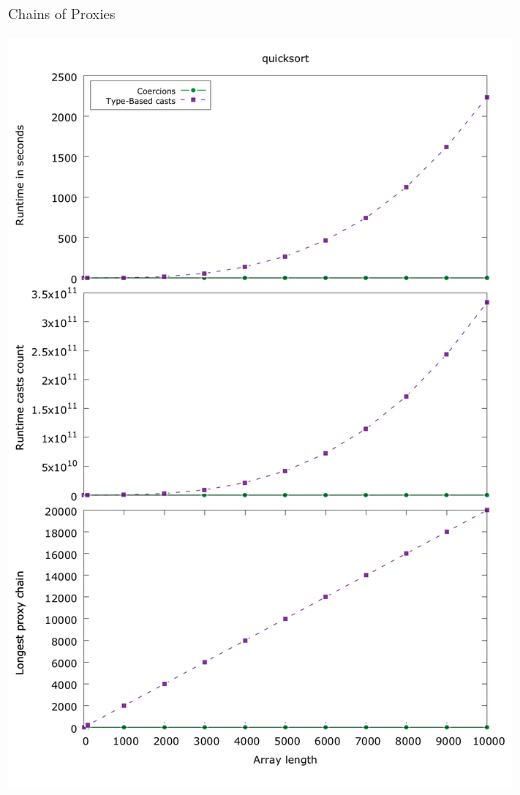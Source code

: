 \documentclass[12pt,dvipsnames]{beamer}
\begin{document}
\begin{frame}[fragile]{Chains of Proxies}
    \begin{center}
    \includegraphics[scale=0.14]{quicksort.png}
  \end{center}
\end{frame}
\end{document}
